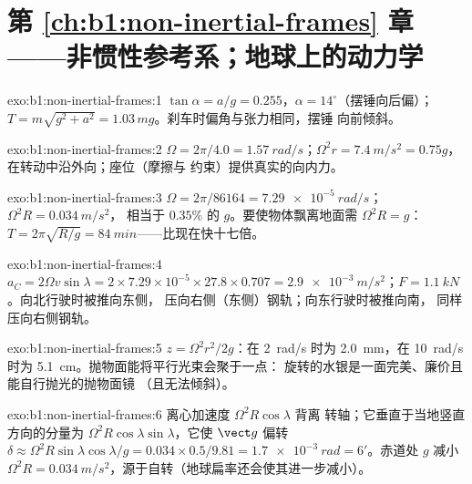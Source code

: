 \section*{第 \ref{ch:b1:non-inertial-frames} 章——非惯性参考系；地球上的动力学}

\begin{solution}{exo:b1:non-inertial-frames:1}
$\tan\alpha = a/g = 0.255$，$\alpha = 14^\circ$（摆锤向后偏）；
$T = m\sqrt{g^2 + a^2} = 1.03\,mg$。刹车时偏角与张力相同，摆锤
向前倾斜。
\end{solution}

\begin{solution}{exo:b1:non-inertial-frames:2}
$\Omega = 2\pi/4.0 = \qty{1.57}{rad/s}$；$\Omega^2r = \qty{7.4}{m/s^2} = 0.75g$，
在转动中沿外向；座位（摩擦与
约束）提供真实的向内力。
\end{solution}

\begin{solution}{exo:b1:non-inertial-frames:3}
$\Omega = 2\pi/86164 = \qty{7.29e-5}{rad/s}$；$\Omega^2R = \qty{0.034}{m/s^2}$，
相当于 $0.35\%$ 的 $g$。要使物体飘离地面需 $\Omega^2R = g$：$T = 2\pi\sqrt{R/g} =
\qty{84}{min}$——比现在快十七倍。
\end{solution}

\begin{solution}{exo:b1:non-inertial-frames:4}
$a_C = 2\Omega v\sin\lambda = 2 \times 7.29\times10^{-5} \times 27.8 \times 0.707
= \qty{2.9e-3}{m/s^2}$；$F = \qty{1.1}{kN}$。向北行驶时被推向东侧，
压向右侧（东侧）钢轨；向东行驶时被推向南，
同样压向右侧钢轨。
\end{solution}

\begin{solution}{exo:b1:non-inertial-frames:5}
$z = \Omega^2r^2/2g$：在 \qty{2}{rad/s} 时为 \qty{2.0}{mm}，在
\qty{10}{rad/s} 时为 \qty{5.1}{cm}。抛物面能将平行光束会聚于一点：
旋转的水银是一面完美、廉价且能自行抛光的抛物面镜
（且无法倾斜）。
\end{solution}

\begin{solution}{exo:b1:non-inertial-frames:6}
离心加速度 $\Omega^2R\cos\lambda$ 背离
转轴；它垂直于当地竖直方向的分量为 $\Omega^2R\cos\lambda
\sin\lambda$，它使 $\vect g$ 偏转 $\delta \approx \Omega^2R\sin\lambda\cos\lambda/g
= 0.034 \times 0.5/9.81 = \qty{1.7e-3}{rad} = 6'$。赤道处 $g$ 减小
$\Omega^2R = \qty{0.034}{m/s^2}$，源于自转（地球扁率还会使其进一步减小）。
\end{solution}

